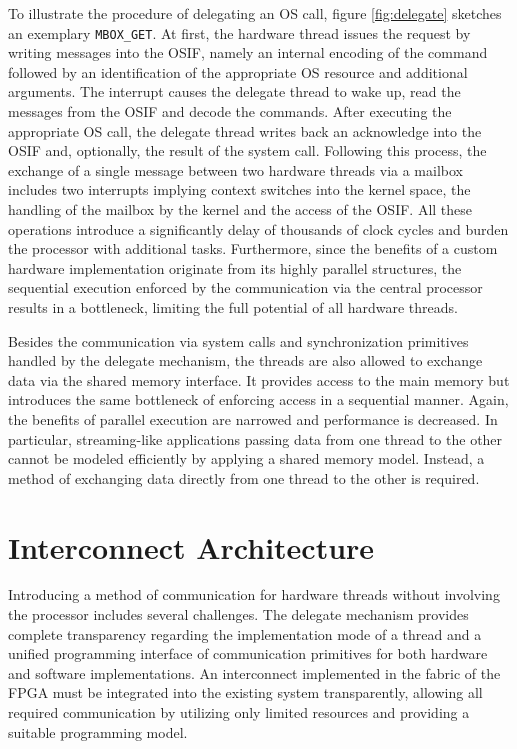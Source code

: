 To illustrate the procedure of delegating an \ac{OS} call, figure
\ref{fig:delegate} sketches an exemplary \lstinline{MBOX_GET}. At first, the
hardware thread issues the request by writing messages into the \ac{OSIF},
namely an internal encoding of the command followed by an identification of
the appropriate \ac{OS} resource and additional arguments. The interrupt
causes the delegate thread to wake up, read the messages from the \ac{OSIF}
and decode the commands. After executing the appropriate \ac{OS} call, the
delegate thread writes back an acknowledge into the \ac{OSIF} and, optionally,
the result of the system call. Following this process, the exchange of a
single message between two hardware threads via a mailbox includes two
interrupts implying context switches into the kernel space, the handling of
the mailbox by the kernel and the access of the \ac{OSIF}. All these
operations introduce a significantly delay of thousands of clock cycles and
burden the processor with additional tasks. Furthermore, since the benefits of
a custom hardware implementation originate from its highly parallel
structures, the sequential execution enforced by the communication via the
central processor results in a bottleneck, limiting the full potential of all
hardware threads.

Besides the communication via system calls and synchronization primitives
handled by the delegate mechanism, the threads are also allowed to exchange
data via the shared memory interface. It provides access to the main memory
but introduces the same bottleneck of enforcing access in a sequential manner.
Again, the benefits of parallel execution are narrowed and performance is
decreased. In particular, streaming-like applications passing data from one
thread to the other cannot be modeled efficiently by applying a shared memory
model. Instead, a method of exchanging data directly from one thread to the
other is required.

\section{Interconnect Architecture}

Introducing a method of communication for hardware threads without involving
the processor includes several challenges. The delegate mechanism provides
complete transparency regarding the implementation mode of a thread and a
unified programming interface of communication primitives for both hardware
and software implementations. An interconnect implemented in the fabric of the
\ac{FPGA} must be integrated into the existing system transparently, allowing
all required communication by utilizing only limited resources and providing a
suitable programming model.

